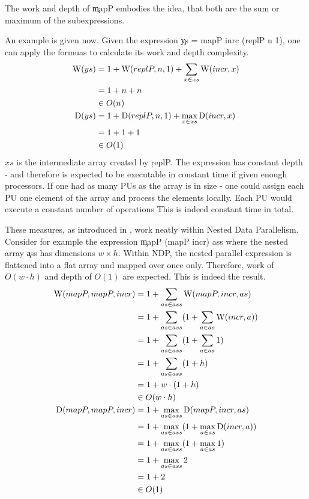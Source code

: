   The work and depth of \c{mapP} embodies the idea, that both are the sum or maximum of the subexpressions.
  
  An example is given now.
  Given the expression \c{ys = mapP inrc (replP n 1)}, one can apply
  the formuas to calculate its work and depth complexity.
  \begin{equation*}
  \begin{split}
  \textrm{W}(ys)
        & = 1 + \textrm{W}(replP,n,1) + \sum_{x \in xs}\textrm{W}(incr,x) \\
        & = 1 + n + n \\
        & \in O(n) \\
  \textrm{D}(ys) & = 1 + \textrm{D}(replP,n,1) + \max_{x \in xs}\textrm{D}(incr,x) \\
      & = 1 + 1 + 1 \\
      & \in O(1) \\
  \end{split}
  \end{equation*}
  $xs$ is the intermediate array created by \c{replP}.
  The expression has constant depth - and therefore
  is expected to be executable in constant time if given enough processors.
  If one had as many PUs as the array is in size
  - one could assign each PU one element of the array and process
  the elements locally. Each PU would execute a constant number of operations
  This is indeed constant time in total.
  
  These measures, as introduced in \cite{Belloch1996}, work
  neatly within Nested Data Parallelism. Consider for example the
  expression \c{mapP (mapP incr) ass} where the
  nested array \c{ass} has dimensions $w \times h$.
  Within NDP, the nested parallel expression is flattened into a
  flat array and mapped over once only.
  Therefore, work of $O(w \cdot h)$ and depth of $O(1)$ are expected.
  This is indeed the result.
  \begin{equation*}
  \begin{split}
  \textrm{W}(mapP,mapP,incr)
        & = 1 + \sum_{as \in ass}\textrm{W}(mapP,incr,as) \\
        & = 1 + \sum_{as \in ass}(1 + \sum_{a \in as} \textrm{W}(incr,a)) \\
        & = 1 + \sum_{as \in ass}(1 + \sum_{a \in as} 1) \\
        & = 1 + \sum_{as \in ass}(1 + h) \\
        & = 1 + w \cdot (1 + h) \\
        & \in O(w \cdot h) \\
  \textrm{D}(mapP,mapP,incr) & = 1 + \max_{as \in ass}\textrm{D}(mapP,incr,as) \\
        & = 1 + \max_{as \in ass}(1 + \max_{a \in as} \textrm{D}(incr,a)) \\
        & = 1 + \max_{as \in ass}(1 + \max_{a \in as} 1) \\
        & = 1 + \max_{as \in ass}2 \\
        & = 1 + 2 \\
        & \in O(1) \\
  \end{split}
  \end{equation*}
  
